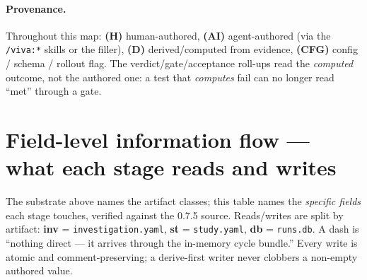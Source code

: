 \documentclass[11pt]{article}
\newcommand{\code}[1]{\texttt{\small #1}}
\begin{document}
\paragraph{Provenance.} Throughout this map: \textbf{(H)} human-authored, \textbf{(AI)}
agent-authored (via the \code{/viva:*} skills or the filler), \textbf{(D)} derived/computed from
evidence, \textbf{(CFG)} config / schema / rollout flag. The verdict/gate/acceptance roll-ups read
the \emph{computed} outcome, not the authored one: a test that \emph{computes} fail can no longer
read ``met'' through a gate.

\section{Field-level information flow --- what each stage reads and writes}

The substrate above names the artifact classes; this table names the \emph{specific
fields} each stage touches, verified against the 0.7.5 source. Reads/writes are split by
artifact: \textbf{inv} = \code{investigation.yaml}, \textbf{st} = \code{study.yaml},
\textbf{db} = \code{runs.db}. A dash is ``nothing direct --- it arrives through the
in-memory cycle bundle.'' Every write is atomic and comment-preserving; a derive-first
writer never clobbers a non-empty authored value.
\end{document}
